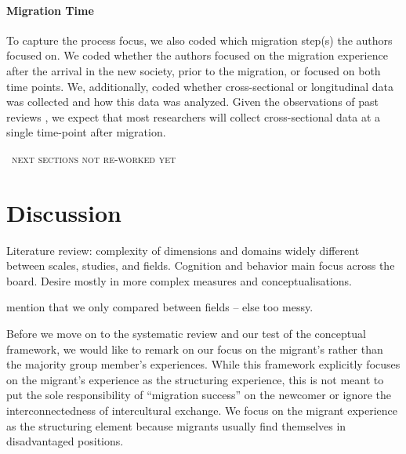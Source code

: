 \documentclass[man, 12pt, a4paper]{apa7}
\newcommand\Warning[1][2ex]{%
  \renewcommand\stacktype{L}%
  \scaleto{\stackon[1.3pt]{\color{red}$\triangle$}{\tiny\bfseries !}}{#1}}%
\begin{document}
\paragraph{Migration Time}
To capture the process focus, we also coded which migration step(s) the authors focused on. We coded whether the authors focused on the migration experience after the arrival in the new society, prior to the migration, or focused on both time points. We, additionally, coded whether cross-sectional or longitudinal data was collected and how this data was analyzed. Given the observations of past reviews \citep[e.g.,][]{Brown2011, Ward2019}, we expect that most researchers will collect cross-sectional data at a single time-point after migration.

\begin{center}
    \Warning\ \textsc{next sections not re-worked yet} \Warning
\end{center}



\section{Discussion}

Literature review: complexity of dimensions and domains widely different between scales, studies, and fields. Cognition and behavior main focus across the board. Desire mostly in more complex measures and conceptualisations.

mention that we only compared between fields -- else too messy.

Before we move on to the systematic review and our test of the conceptual framework, we would like to remark on our focus on the migrant's rather than the majority group member's experiences. 
While this framework explicitly focuses on the migrant's experience as the structuring experience, this is not meant to put the sole responsibility of ``migration success'' on the newcomer or ignore the interconnectedness of intercultural exchange. We focus on the migrant experience as the structuring element because migrants usually find themselves in disadvantaged positions. 
\end{document}
